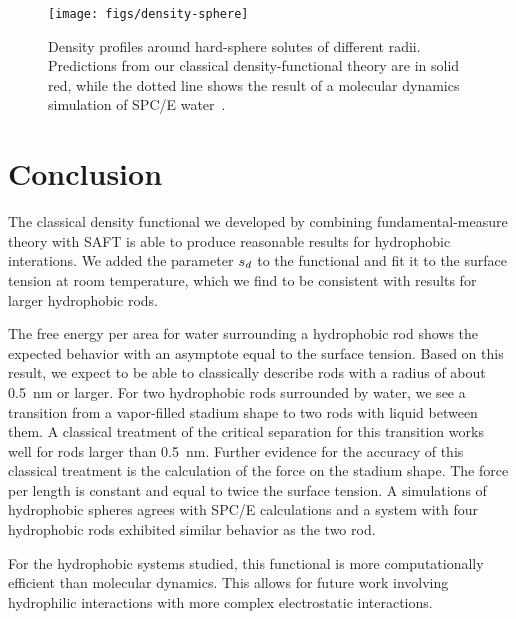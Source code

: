 \documentclass[letterpaper,twocolumn,amsmath,amssymb,prb]{revtex4-1}
\begin{document}
\begin{figure}
\begin{center}
\texttt{[image: figs/density-sphere]}
\end{center}
\caption{ Density profiles around hard-sphere solutes of different radii. Predictions
  from our classical density-functional theory are in solid red, while
  the dotted line shows the result of a molecular dynamics simulation
  of SPC/E water~\cite{huang2001shs}.  }
\label{fig:density-sphere}
\end{figure}

\section{Conclusion}

The classical density functional we developed by combining fundamental-measure 
theory with SAFT is able to produce reasonable results for hydrophobic interations.
We added the parameter $s_d$ to the functional and fit it to the surface tension
at room temperature, which we find to be consistent with results for larger hydrophobic
rods. 

The free energy per area for water surrounding a hydrophobic rod shows the
expected behavior with an asymptote equal to the surface tension.
Based on this result, we expect to be
able to classically describe rods with a radius of about 0.5~nm or larger. 
For two hydrophobic rods surrounded by water, we see a transition from a vapor-filled
stadium shape to two rods with liquid between them. A
classical treatment of the critical separation for this transition
works well for rods larger than 0.5~nm.  Further evidence for the
accuracy of this classical treatment is the calculation of the force on the
stadium shape. The force per length is constant and equal to twice the
surface tension. A simulations of hydrophobic spheres agrees with
SPC/E calculations and a system with four hydrophobic rods exhibited
similar behavior as the two rod.

For the hydrophobic systems studied, this functional is more computationally 
efficient than molecular dynamics. This allows for future work
involving hydrophilic interactions with more complex electrostatic interactions.


\end{document}
